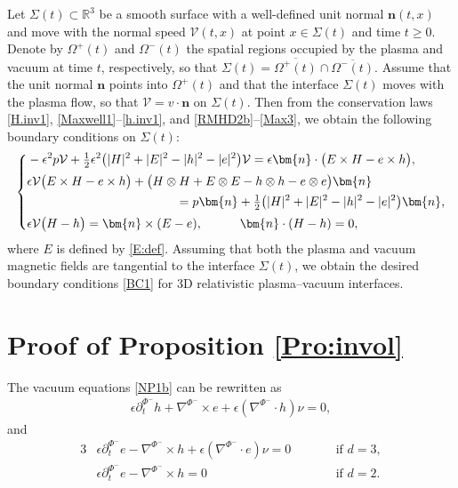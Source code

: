 \documentclass[twoside,11pt]{article}
\numberwithin{equation}{section}
\def\p{\partial}
\begin{document}
Let $\Sigma(t)\subset\mathbb{R}^3$ be a smooth surface with a well-defined unit normal $\bm{n}(t,x)$ and move with the normal speed $\mathcal{V}(t,x)$ at point $x\in \Sigma(t)$ and time $t\geq 0$.
Denote by $\Omega^+(t)$ and $\Omega^-(t)$ the spatial regions occupied by the plasma and vacuum at time $t$, respectively, so that $\Sigma(t)=\overline{\Omega^+(t)}\cap\overline{\Omega^-(t)}$.
Assume that the unit normal $\bm{n}$ points into $\Omega^+(t)$ and that the interface $\Sigma(t)$ moves with the plasma flow, so that $\mathcal{V}=v\cdot \bm{n}$ on $\Sigma(t)$.
Then from the conservation laws \eqref{H.inv1}, \eqref{Maxwell1}--\eqref{h.inv1}, and \eqref{RMHD2b}--\eqref{Max3}, we obtain the following boundary conditions on $\Sigma(t)$:
	\begin{align} \nonumber %
		\left\{
		\begin{aligned}
			& -\epsilon^2 p \mathcal{V} +\tfrac{1}{2}\epsilon^2 \big(|H|^2+ |E|^2-|h|^2-|e|^2  \big)  \mathcal{V}
			=		\epsilon \bm{n}\cdot \big( E\times H-e\times h\big),\\[0.5mm]
			&\epsilon\mathcal{V} \big(E\times H -e\times h\big)+\big(H\otimes H+E\otimes E-h\otimes h-e\otimes e \big)\bm{n}
			\\
			&\hspace*{12em}
			=p\bm{n} +\tfrac{1}{2}\big(|H|^2+|E|^2-|h|^2-|e|^2\big)\bm{n},\\[0.5mm]
			&\epsilon\mathcal{V} \big(H-h\big)=\bm{n}\times (E-e),\qquad\quad
			\bm{n}\cdot (H-h)=0,
		\end{aligned}
		\right.
	\end{align}
	where $E$ is defined by \eqref{E:def}.
Assuming that both the plasma and vacuum magnetic fields are tangential to the interface $\Sigma(t)$, we obtain the desired boundary conditions \eqref{BC1} for 3D relativistic plasma--vacuum interfaces.
	
 
 \vspace*{2mm}
\section[Proof of Proposition \ref{Pro:invol}]{Proof of Proposition \ref{Pro:invol}} \label{app:C}	
The vacuum equations \eqref{NP1b} can be rewritten as
\begin{align} \label{h:equ.non}
	\epsilon \p_t^{\Phi^-} h+\nabla^{\Phi^-}\times e+\epsilon  (\nabla^{\Phi^-}\cdot h) \nu =0,
\end{align}	
and
\begin{alignat}{3}
\label{e:equ.non.3D}	
		&\epsilon \p_t^{\Phi^-} e-\nabla^{\Phi^-}\times h+\epsilon  (\nabla^{\Phi^-}\cdot e) \nu =0\qquad&&\textrm{if }d=3,\\
\label{e:equ.non.2D}			
		&\epsilon \p_t^{\Phi^-} e-\nabla^{\Phi^-}\times h =0\qquad&&\textrm{if }d=2. 	
\end{alignat}
\end{document}
